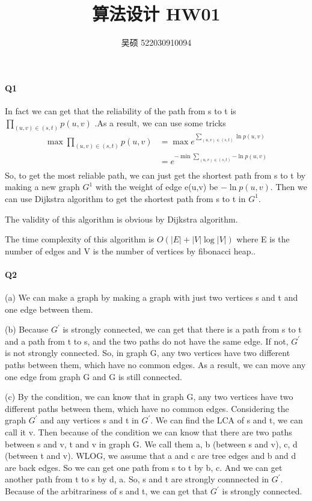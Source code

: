 \documentclass[UTF8]{ctexart}
\renewcommand{\(}{\left(}
\renewcommand{\)}{\right)}
\begin{document}
\title{算法设计 HW01}  
\author{吴硕 522030910094}
\maketitle

\paragraph{Q1} 
In fact we can get that the reliability of the path from s to t is $\prod_{\(u,v\)\in{\(s,t\)}}^{}{p(u,v)}$
.As a result, we can use some tricks 
$$
\begin{aligned}
    \max\prod_{\(u,v\)\in{\(s,t\)}}^{}{p(u,v)}&=\max  {e^{\sum_{\(u,v\)\in{\(s,t\)}}^{}{\ln{p(u,v)}}}} \\
    &={e^{-\min\sum_{\(u,v\)\in{\(s,t\)}}^{}{-\ln{p(u,v)}}}} \\
\end{aligned}
$$
So, to get the most reliable path, we can just get the shortest path from s to t by making a new
graph $G^{1}$ with the weight of edge e(u,v) be $-\ln{p(u,v)}$.
Then we can use Dijkstra algorithm to get the shortest path from s to t in $G^{1}$.

The validity of this algorithm is obvious by Dijkstra algorithm.

The time complexity of this algorithm is $O\({\left| E\right|+\left| V\right|\log{\left| V\right|}}\)$ where E is the number of edges and V is the number of vertices by fibonacci heap..

\paragraph{Q2}

(a) We can make a graph by making a graph with just two vertices s and t and one edge between them. 

(b)  Because $G^{'}$ is strongly connected, we can get that there is a path from s to t and a path from t to s, and the two paths do not have the same edge.
If not, $G^{'}$ is not strongly connected. So, in graph G, any two vertices have two different paths between them, which have no common edges.
As a result, we can move any one edge from graph G and G is still connected.

(c) By the condition, we can know that in graph G, any two vertices have two different paths between them, which have no common edges.
Considering the graph $G^{'}$ and any vertices s and t in $G^{'}$. We can find the LCA of s and t, we can call
it v. Then because of the condition we can know that there are two paths between s and v, t and v in graph G. 
We call them a, b (between s and v), c, d (between t and v). WLOG, we assume that a and c are tree edges and b and
d are back edges. So we can get one path from s to t by b, c. And we can get another path from t to s by d, a. 
So, s and t are strongly connnected in $G^{'}$. Because of the arbitrariness of s and t, we can get that $G^{'}$ is strongly connected.
\end{document}
